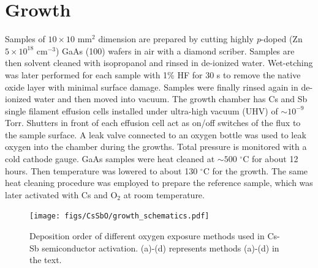\section{Growth}

Samples of $10\times10$ mm$^2$ dimension are prepared by cutting highly \emph{p}-doped (Zn $5\times 10^{18} \textrm{ cm}^{-3}$) GaAs (100) wafers in air with a diamond scriber. Samples are then solvent cleaned with isopropanol and rinsed in de-ionized water. Wet-etching was later performed for each sample with 1\% HF for 30 s to remove the native oxide layer with minimal surface damage.\cite{reiVilar2005,feng2019_etching} Samples were finally rinsed again in de-ionized water and then moved into vacuum. 
The growth chamber has Cs and Sb single filament effusion cells\cite{cultrera2014_alkali} installed under ultra-high vacuum (UHV) of $\sim 10^{-9}$ Torr. Shutters in front of each effusion cell act as on/off switches of the flux to the sample surface. A leak valve connected to an oxygen bottle was used to leak oxygen into the chamber during the growths. Total pressure is monitored with a cold cathode gauge. GaAs samples were heat cleaned at $\sim 500$ $^\circ$C for about 12 hours. Then temperature was lowered to about 130 $^\circ$C for the growth.
The same heat cleaning procedure was employed to prepare the reference sample, which was later activated with Cs and O$_2$ at room temperature.


\begin{figure}
	\centering
	\texttt{[image: figs/CsSbO/growth\_schematics.pdf]}
	\caption{Deposition order of different oxygen exposure methods used in Cs-Sb semiconductor activation. (a)-(d) represents methods (a)-(d) in the text.}
	\label{fig_growth_schematics}
\end{figure}

